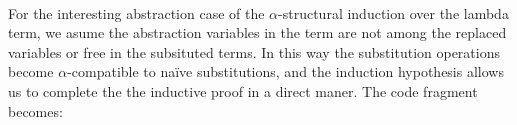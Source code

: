 \documentclass{entcs}
\newcommand{\alp}{\ensuremath{\alpha}}
\begin{document}
\begin{code}
\\
\>[0]\<[5]%
\>[5]    \<%
\\
\>[5]\<[7]%
\>[7]\AgdaSymbol{(} \AgdaFunction{[}    \AgdaFunction{]}\AgdaSymbol{)} \AgdaFunction{[}    \AgdaFunction{[}    \AgdaFunction{]} \AgdaFunction{]} \<[41]%
\>[41]\<%
\\
\>[0]\<[5]%
\>[5]\<%
\\
\>[0]\<[5]%
\>[5]      \AgdaFunction{[}    \AgdaFunction{[}    \AgdaFunction{]} \AgdaFunction{]}\AgdaSymbol{)} \AgdaSymbol{(}   \AgdaSymbol{(}\AgdaSymbol{))} \<[68]%
\>[68]\<%
\\
\>[5]\<[7]%
\>[7]\AgdaSymbol{(} \AgdaFunction{[}    \AgdaFunction{]}\AgdaSymbol{)} \AgdaFunction{[}    \AgdaFunction{[}    \AgdaFunction{]} \AgdaFunction{]} \<[41]%
\>[41]\<%
\\
\>[0]\<[5]%
\>[5]\<%
\end{code}


\noindent For the interesting abstraction case of the \alp-structural induction over the lambda term, we asume the abstraction variables in the term are not among the replaced variables or free in the subsituted terms. In this way the substitution operations become \alp-compatible to na\"ive substitutions, and the induction hypothesis allows us to complete the the inductive proof in a direct maner. The code fragment becomes:
 
\end{document}
